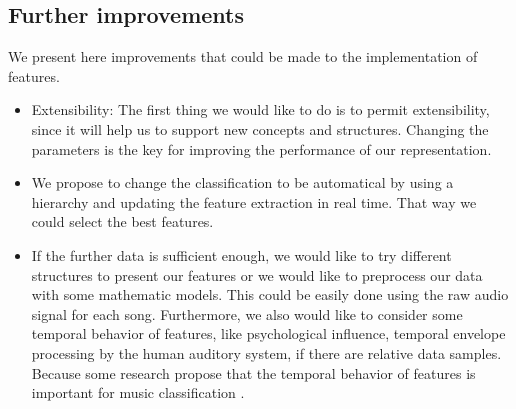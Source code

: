 \documentclass[a4paper,12pt]{article}
\begin{document}
\subsection{Further improvements}

We present here improvements that could be made to the implementation of features.

\begin{itemize}
    \item Extensibility: The first thing we would like to do is to permit extensibility, since it will help us to support new concepts and structures. Changing the parameters is the key for improving the performance of our representation.
    \item We propose to change the classification to be automatical by using a hierarchy and updating the feature extraction in real time. That way we could select the best features.
    \item If the further data is sufficient enough, we would like to try different structures to present our features or we would like to preprocess our data with some mathematic models. This could be easily done using the raw audio signal for each song. Furthermore, we also would like to consider some temporal behavior of features, like psychological influence, temporal envelope processing by the human auditory system, if there are relative data samples. Because some research propose that the temporal behavior of features is important for music classification \cite{mckinney2003features}.
\end{itemize}


\end{document}
